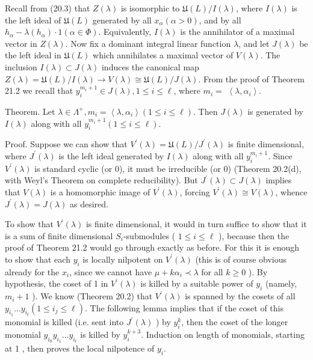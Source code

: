 \documentclass[10pt]{article}
\begin{document}
Recall from (20.3) that $Z(\lambda)$ is isomorphic to $\mathfrak{U}(L) / I(\lambda)$, where $I(\lambda)$ is the left ideal of $\mathfrak{U}(L)$ generated by all $x_{\alpha}(\alpha>0)$, and by all $h_{\alpha}-\lambda\left(h_{\alpha}\right) \cdot 1(\alpha \in \Phi)$. Equivalently, $I(\lambda)$ is the annihilator of a maximal vector in $Z(\lambda)$. Now fix a dominant integral linear function $\lambda$, and let $J(\lambda)$ be the left ideal in $\mathfrak{U}(L)$ which annihilates a maximal vector of $V(\lambda)$. The inclusion $I(\lambda) \subset J(\lambda)$ induces the canonical map $Z(\lambda)=\mathfrak{U}(L) / I(\lambda) \rightarrow V(\lambda) \cong \mathfrak{U}(L) / J(\lambda)$. From the proof of Theorem 21.2 we recall that $y_{i}^{m_{i}+1} \in J(\lambda), 1 \leq i \leq \ell$, where $m_{i}=$ $\left\langle\lambda, \alpha_{i}\right\rangle$.

Theorem. Let $\lambda \in \Lambda^{+}, m_{i}=\left\langle\lambda, \alpha_{i}\right\rangle(1 \leq i \leq \ell)$. Then $J(\lambda)$ is generated by $I(\lambda)$ along with all $y_{i}^{m_{i}+1}(1 \leq i \leq \ell)$.

Proof. Suppose we can show that $V^{\prime}(\lambda)=\mathfrak{U}(L) / J^{\prime}(\lambda)$ is finite dimensional, where $J^{\prime}(\lambda)$ is the left ideal generated by $I(\lambda)$ along with all $y_{i}^{m_{i}+1}$. Since $V^{\prime}(\lambda)$ is standard cyclic (or 0), it must be irreducible (or 0) (Theorem 20.2(d), with Weyl's Theorem on complete reducibility). But $J^{\prime}(\lambda) \subset J(\lambda)$ implies that $V(\lambda)$ is a homomorphic image of $V^{\prime}(\lambda)$, forcing $V^{\prime}(\lambda) \cong V(\lambda)$, whence $J^{\prime}(\lambda)=J(\lambda)$ as desired.

To show that $V^{\prime}(\lambda)$ is finite dimensional, it would in turn suffice to show that it is a sum of finite dimensional $S_{i}$-submodules ( $1 \leq i \leq \ell$ ), because then the proof of Theorem 21.2 would go through exactly as before. For this it is enough to show that each $y_{i}$ is locally nilpotent on $V^{\prime}(\lambda)$ (this is of course obvious already for the $x_{i}$, since we cannot have $\mu+k \alpha_{i} \prec \lambda$ for all $k \geq 0$ ). By hypothesis, the coset of 1 in $V^{\prime}(\lambda)$ is killed by a suitable power of $y_{i}$ (namely, $m_{i}+1$ ). We know (Theorem 20.2) that $V^{\prime}(\lambda)$ is spanned by the cosets of all $y_{i_{1}} \ldots y_{i_{t}}\left(1 \leq i_{j} \leq \ell\right)$. The following lemma implies that if the coset of this monomial is killed (i.e. sent into $J^{\prime}(\lambda)$ ) by $y_{i}^{k}$, then the coset of the longer monomial $y_{i_{0}} y_{i_{1}} \ldots y_{i_{t}}$ is killed by $y_{i}^{k+3}$. Induction on length of monomials, starting at 1 , then proves the local nilpotence of $y_{i}$.
\end{document}

